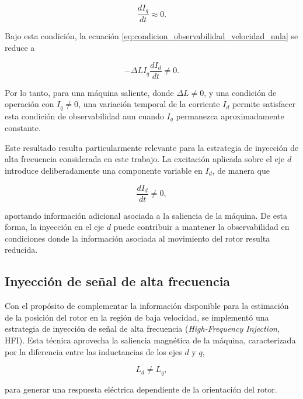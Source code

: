 \begin{equation}
    \frac{dI_q}{dt} \approx 0.
    \label{eq:iq_regimen_estacionario}
\end{equation}

Bajo esta condición, la ecuación
\eqref{eq:condicion_observabilidad_velocidad_nula} se reduce a

\begin{equation}
    -\Delta L I_q
    \frac{dI_d}{dt}
    \neq 0.
    \label{eq:observabilidad_id_variable}
\end{equation}

Por lo tanto, para una máquina saliente, donde $\Delta L\neq0$, y una
condición de operación con $I_q\neq0$, una variación temporal de la
corriente $I_d$ permite satisfacer esta condición de observabilidad aun
cuando $I_q$ permanezca aproximadamente constante.

Este resultado resulta particularmente relevante para la estrategia de
inyección de alta frecuencia considerada en este trabajo. La excitación
aplicada sobre el eje $d$ introduce deliberadamente una componente
variable en $I_d$, de manera que

\begin{equation}
    \frac{dI_d}{dt}\neq0,
\end{equation}

aportando información adicional asociada a la saliencia de la máquina.
De esta forma, la inyección en el eje $d$ puede contribuir a mantener la
observabilidad en condiciones donde la información asociada al movimiento
del rotor resulta reducida.

\subsection{Inyección de señal de alta frecuencia}
\label{subsec:metodologia_hfi}

Con el propósito de complementar la información disponible para la estimación de la posición del rotor en la región de baja velocidad, se implementó una estrategia de inyección de señal de alta frecuencia (\textit{High-Frequency Injection}, HFI). Esta técnica aprovecha la saliencia magnética de la máquina, caracterizada por la diferencia entre las inductancias de los ejes $d$ y $q$,

\begin{equation}
L_d \neq L_q,
\end{equation}

para generar una respuesta eléctrica dependiente de la orientación del rotor.

